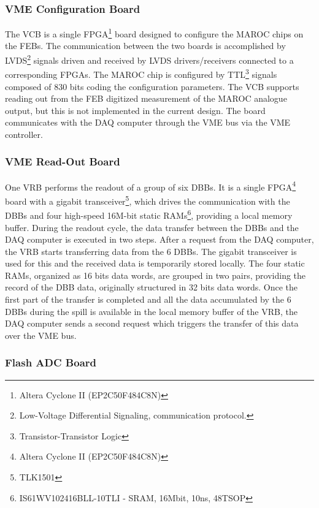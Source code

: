 \documentclass[a4paper,11pt]{article}
\begin{document}
\subsubsection{VME Configuration Board}
The VCB is a single FPGA\footnote{Altera Cyclone II (EP2C50F484C8N)} board designed to configure the MAROC chips on the FEBs. The
communication between the two boards is accomplished by LVDS\footnote{Low-Voltage Differential Signaling, communication protocol.} signals driven and
received by LVDS drivers/receivers connected to a corresponding FPGAs. The MAROC chip is configured by TTL\footnote{Transistor-Transistor
Logic} signals composed of 830 bits coding the configuration parameters. The VCB supports reading out from the FEB digitized measurement of the
MAROC analogue output, but this is not implemented in the current design. The board communicates with the DAQ computer through the VME bus via the
VME controller. 

\subsubsection{VME Read-Out Board}\label{electronics:subsec:vme_readout_board}

One VRB performs the readout of a group of six DBBs. It is a single FPGA\footnote{Altera Cyclone II (EP2C50F484C8N)} board with a gigabit 
transceiver\footnote{TLK1501}, which drives the communication with the DBBs and four high-speed 16M-bit static RAMs\footnote{IS61WV102416BLL-10TLI
- SRAM, 16Mbit, 10ns, 48TSOP}, providing a local memory buffer. During the readout cycle, the data transfer between the DBBs and the DAQ computer
is executed in two steps. After a request from the DAQ computer, the VRB starts transferring data from the 6 DBBs. The gigabit transceiver is used
for this and the received data is temporarily stored locally. The four static RAMs, organized as 16 bits data words, are grouped in two pairs,
providing the record of the DBB data, originally structured in 32 bits data words. Once the first part of the transfer is completed and all
the data accumulated by the 6 DBBs during the spill is available in the local memory buffer of the VRB, the DAQ computer sends a second request which
triggers the transfer of this data over the VME bus.

\subsubsection{Flash ADC Board}\label{electronics:subsec:fast_adc_board}
\end{document}
